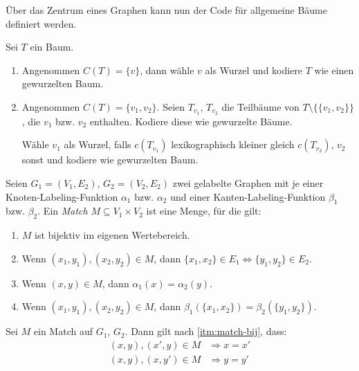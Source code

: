 \begin{definition}
    Über das Zentrum eines Graphen kann nun der Code für allgemeine Bäume definiert werden.

    Sei $ T $ ein Baum.
    \begin{enumerate}
        \item Angenommen $ C(T) = \{ v \} $, dann wähle $ v $ als Wurzel und kodiere $ T $ wie einen gewurzelten Baum.
        \item Angenommen $ C(T) = \{ v_1, v_2 \} $.
        Seien $ T_{v_1} $, $ T_{v_2} $ die Teilbäume von $ T \setminus \{\{ v_1, v_2 \}\}$, die $ v_1 $ bzw. $ v_2 $ enthalten.
        Kodiere diese wie gewurzelte Bäume.

        Wähle $ v_1 $ als Wurzel, falls $ c(T_{v_1}) $ lexikographisch kleiner gleich $ c(T_{v_2}) $, $ v_2 $ sonst und kodiere wie gewurzelten Baum.
    \end{enumerate}
\end{definition}

\begin{definition}[Match]
    Seien $ G_1 = (V_1, E_2) $, $ G_2 = (V_2, E_2) $ zwei gelabelte Graphen mit je einer Knoten-Labeling-Funktion $ \alpha_1 $ bzw. $ \alpha_2 $ und einer Kanten-Labeling-Funktion $ \beta_1 $ bzw. $ \beta_2 $.
    Ein \textit{Match} $ M \subseteq V_1 \times V_2 $ ist eine Menge, für die gilt:
    \begin{enumerate}
        \item \label{itm:match-bij}
        $ M $ ist bijektiv im eigenen Wertebereich.
        \item Wenn $ (x_1, y_1), (x_2, y_2) \in M $, dann $ \{ x_1, x_2 \} \in E_1 \Leftrightarrow \{ y_1, y_2 \} \in E_2 $.
        \item Wenn $ (x, y) \in M $, dann $ \alpha_1(x) = \alpha_2(y) $.
        \item Wenn $ (x_1, y_1), (x_2, y_2) \in M $, dann $ \beta_1(\{ x_1, x_2 \}) = \beta_2(\{ y_1, y_2 \}) $.
    \end{enumerate}
\end{definition}

\begin{proposition}
    Sei $ M $ ein Match auf $ G_1 $, $ G_2 $.
    Dann gilt nach \ref{itm:match-bij}, dass:
    \begin{align*}
        (x, y), (x', y) \in M & \Rightarrow x = x' \\
        (x, y), (x, y') \in M & \Rightarrow y = y'
    \end{align*}
\end{proposition}

